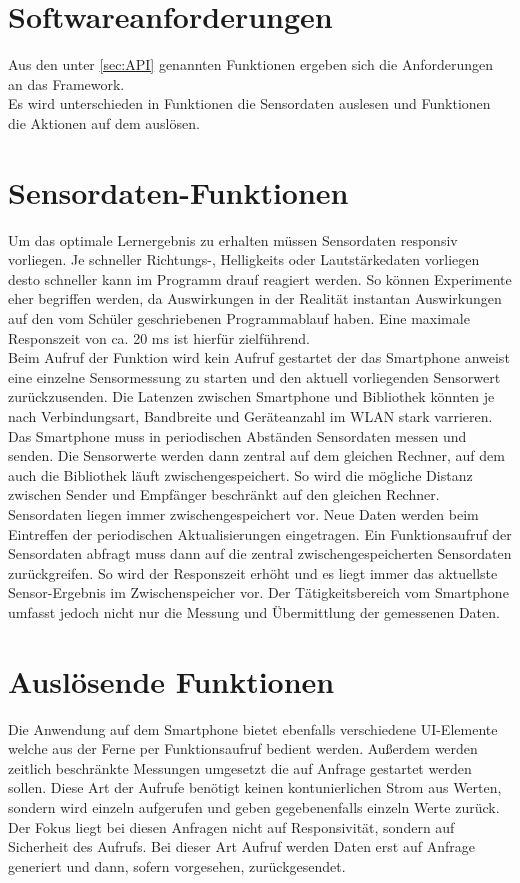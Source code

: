 \documentclass[11pt,a4paper]{report}
\begin{document}
\section{Softwareanforderungen}\label{sec:anforderungen}
Aus den unter \ref*{sec:API} genannten Funktionen ergeben sich die Anforderungen an das Framework.
\\
Es wird unterschieden in Funktionen die Sensordaten auslesen und Funktionen die Aktionen auf dem  auslösen.
\section{Sensordaten-Funktionen}
Um das optimale Lernergebnis zu erhalten müssen Sensordaten responsiv vorliegen.
Je schneller Richtungs-, Helligkeits oder Lautstärkedaten vorliegen desto schneller kann im Programm drauf reagiert werden.
So können Experimente eher begriffen werden, da Auswirkungen in der Realität instantan Auswirkungen auf den vom Schüler geschriebenen Programmablauf haben.
Eine maximale Responszeit von ca. 20 ms ist hierfür zielführend.
\\
Beim Aufruf der Funktion wird kein Aufruf gestartet der das Smartphone anweist eine einzelne Sensormessung zu starten und den aktuell vorliegenden Sensorwert zurückzusenden.
Die Latenzen zwischen Smartphone und Bibliothek könnten je nach Verbindungsart, Bandbreite und Geräteanzahl im WLAN stark varrieren.
Das Smartphone muss in periodischen Abständen Sensordaten messen und senden. Die Sensorwerte werden dann zentral auf dem gleichen Rechner, auf dem auch die Bibliothek läuft zwischengespeichert.
So wird die mögliche Distanz zwischen Sender und Empfänger beschränkt auf den gleichen Rechner.
Sensordaten liegen immer zwischengespeichert vor.
Neue Daten werden beim Eintreffen der periodischen Aktualisierungen eingetragen.
Ein Funktionsaufruf der Sensordaten abfragt muss dann auf die zentral zwischengespeicherten Sensordaten zurückgreifen.
So wird der Responszeit erhöht und es liegt immer das aktuellste Sensor-Ergebnis im Zwischenspeicher vor.
Der Tätigkeitsbereich vom Smartphone umfasst jedoch nicht nur die Messung und Übermittlung der gemessenen Daten.

\section{Auslösende Funktionen}
Die Anwendung auf dem Smartphone bietet ebenfalls verschiedene UI-Elemente welche aus der Ferne per Funktionsaufruf bedient werden.
Außerdem werden zeitlich beschränkte Messungen umgesetzt die auf Anfrage gestartet werden sollen.
Diese Art der Aufrufe benötigt keinen kontunierlichen Strom aus Werten, sondern wird einzeln aufgerufen und geben gegebenenfalls einzeln Werte zurück.
Der Fokus liegt bei diesen Anfragen nicht auf Responsivität, sondern auf Sicherheit des Aufrufs.
Bei dieser Art Aufruf werden Daten erst auf Anfrage generiert und dann, sofern vorgesehen, zurückgesendet.
\end{document}
